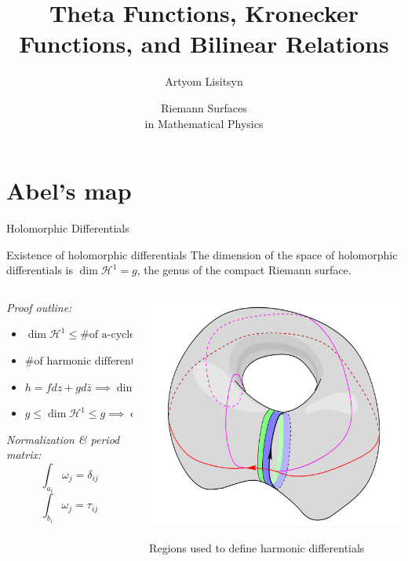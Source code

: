 \documentclass[11pt,aspectratio=169]{beamer}
\title{Theta Functions, Kronecker Functions, and Bilinear Relations}
\date[2023]{Riemann Surfaces \\ in Mathematical Physics}
\author{Artyom Lisitsyn}
\institute{D-PHYS}
\begin{document}
\def\titlefigure{elements/title-page-image}
\titleframe{}

\tocframe{}

\section{Abel's map}

\begin{frame}{Holomorphic Differentials}
    \begin{block}{Existence of holomorphic differentials}
        The dimension of the space of holomorphic differentials is $\dim \mathcal H^1 = g$, the genus of the compact Riemann surface.
    \end{block}

    \begin{columns}[onlytextwidth]
        \begin{column}{0.55\textwidth}
            \emph{Proof outline:}
            \begin{itemize}
                \item $\dim \mathcal H^1 \leq \text{\# of a-cycles} = g$
                \item $\text{\# of harmonic differentials} = \dim H \geq 2g$
                \item $h = f dz + g d \bar z \implies \dim H = 2 \dim \mathcal H^1$
                \item $g \leq \dim \mathcal H^1 \leq g \implies \dim \mathcal H^1 = g$
            \end{itemize}
            \emph{Normalization \& period matrix:}
            \[ \int_{a_i} \omega_j = \delta_{ij} \]
            \[ \int_{b_i} \omega_j = \tau_{ij} \]
        \end{column}
        \begin{column}{0.45\textwidth}
            \center{}
            \includegraphics[width=0.8\columnwidth]{assets/HarmonicDifferential.png}
            
            \tiny Regions used to define harmonic differentials

            \cite{Ber06}
        \end{column}
    \end{columns}
\end{frame}
\end{document}
